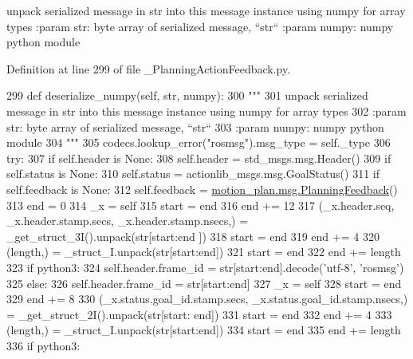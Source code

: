 \begin{DoxyVerb}unpack serialized message in str into this message instance using numpy for array types
:param str: byte array of serialized message, ``str``
:param numpy: numpy python module
\end{DoxyVerb}
 

Definition at line 299 of file \+\_\+\+Planning\+Action\+Feedback.\+py.


\begin{DoxyCode}
299   \textcolor{keyword}{def }deserialize\_numpy(self, str, numpy):
300     \textcolor{stringliteral}{"""}
301 \textcolor{stringliteral}{    unpack serialized message in str into this message instance using numpy for array types}
302 \textcolor{stringliteral}{    :param str: byte array of serialized message, ``str``}
303 \textcolor{stringliteral}{    :param numpy: numpy python module}
304 \textcolor{stringliteral}{    """}
305     codecs.lookup\_error(\textcolor{stringliteral}{"rosmsg"}).msg\_type = self.\_type
306     \textcolor{keywordflow}{try}:
307       \textcolor{keywordflow}{if} self.header \textcolor{keywordflow}{is} \textcolor{keywordtype}{None}:
308         self.header = std\_msgs.msg.Header()
309       \textcolor{keywordflow}{if} self.status \textcolor{keywordflow}{is} \textcolor{keywordtype}{None}:
310         self.status = actionlib\_msgs.msg.GoalStatus()
311       \textcolor{keywordflow}{if} self.feedback \textcolor{keywordflow}{is} \textcolor{keywordtype}{None}:
312         self.feedback = \hyperlink{classmotion__plan_1_1msg_1_1__PlanningFeedback_1_1PlanningFeedback}{motion\_plan.msg.PlanningFeedback}()
313       end = 0
314       \_x = self
315       start = end
316       end += 12
317       (\_x.header.seq, \_x.header.stamp.secs, \_x.header.stamp.nsecs,) = \_get\_struct\_3I().unpack(str[start:end
      ])
318       start = end
319       end += 4
320       (length,) = \_struct\_I.unpack(str[start:end])
321       start = end
322       end += length
323       \textcolor{keywordflow}{if} python3:
324         self.header.frame\_id = str[start:end].decode(\textcolor{stringliteral}{'utf-8'}, \textcolor{stringliteral}{'rosmsg'})
325       \textcolor{keywordflow}{else}:
326         self.header.frame\_id = str[start:end]
327       \_x = self
328       start = end
329       end += 8
330       (\_x.status.goal\_id.stamp.secs, \_x.status.goal\_id.stamp.nsecs,) = \_get\_struct\_2I().unpack(str[start:
      end])
331       start = end
332       end += 4
333       (length,) = \_struct\_I.unpack(str[start:end])
334       start = end
335       end += length
336       \textcolor{keywordflow}{if} python3:

\end{DoxyCode}
